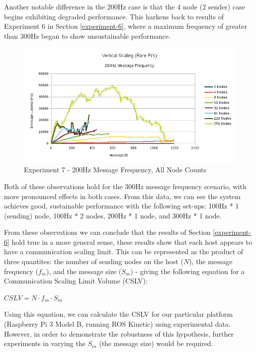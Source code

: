 \documentclass[../dissertation.tex]{subfiles}
\begin{document}
Another notable difference in the 200Hz case is that the 4 node (2 sender) case begins exhibiting degraded performance. This harkens back to results of Experiment 6 in Section \ref{experiment-6}, where a maximum frequency of greater than 300Hz began to show unsustainable performance.

\begin{figure}[H]
\centering
\includegraphics[width=\textwidth]{images/experiment7/vertical_scaling_200hz_all_node_counts.png}
\caption{Experiment 7 - 200Hz Message Frequency, All Node Counts}
\label{exp7-200hz-allnodes}
\end{figure}

Both of these observations hold for the 300Hz message frequency scenario, with more pronounced effects in both cases. From this data, we can see the system achieves good, sustainable performance with the following set-ups: 100Hz * 1 (sending) node, 100Hz * 2 nodes, 200Hz * 1 node, and 300Hz * 1 node.

From these observations we can conclude that the results of Section \ref{experiment-6} hold true in a more general sense, these results show that each host appears to have a communication scaling limit. This can be represented as the product of three quantites: the number of sending nodes on the host ($N$), the message frequency ($f_m$), and the message size ($S_m$) - giving the following equation for a Communication Scaling Limit Volume (CSLV):

\begin{center}
$CSLV = N \cdot f_m \cdot S_m$
\end{center}

Using this equation, we can calculate the CSLV for our particular platform (Raspberry Pi 3 Model B, running ROS Kinetic) using experimental data. However, in order to demonstrate the robustness of this hypothesis, further experiments in varying the $S_m$ (the message size) would be required.
\end{document}
